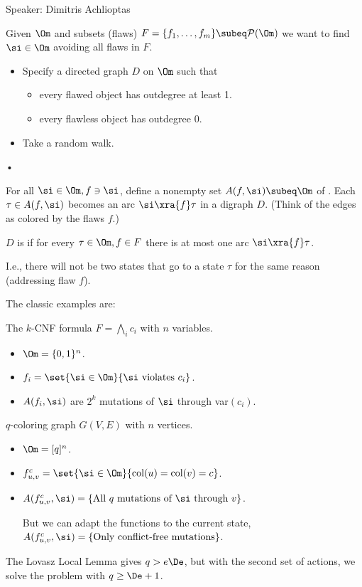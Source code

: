 Speaker: Dimitris Achlioptas

Given $\Om$ and subsets (flaws) $F=\{f_1,\ldots, f_m\}\subeq \cal P(\Om)$ we want to find $\si\in \Om$ avoiding all flaws in $F$.

\begin{itemize}
\item
Specify a directed graph $D$ on $\Om$ such that
\begin{itemize}
\item
every flawed object has outdegree at least 1.
\item
every flawless object has outdegree 0.
\end{itemize}
\item 
Take a random walk.
\end{itemize}•

For all $\si\in \Om,f\ni \si$, define a nonempty set $A(f,\si)\subeq \Om$ of . Each $\tau\in A(f,\si)$ becomes an arc $\si\xra{f} \tau $ in a digraph $D$. (Think of the edges as colored by the flaws $f$.)
\begin{df}
$D$ is  if for every $\tau\in \Om,f\in F$ there is at most one arc $\si\xra{f}\tau$.
\end{df}
I.e., there will not be two states that go to a state $\tau$ for the same reason (addressing flaw $f$).

The classic examples are:
\begin{ex}
The $k$-CNF formula $F=\bigwedge_i c_i$ with $n$ variables.
\begin{itemize}
\item
$\Om=\{0,1\}^n$.
\item $f_i=\set{\si\in \Om}{\si\text{ violates }c_i}$.
\item $A(f_i,\si)$ are $2^k$ mutations of $\si$ through var$(c_i)$.
\end{itemize}
\end{ex}

\begin{ex}
$q$-coloring graph $G(V,E)$ with $n$ vertices.
\begin{itemize}
\item $\Om=[q]^n$.
\item $f_{u,v}^c= \set{\si\in \Om}{\text{col}(u)=\text{col}(v)=c}$.
\item $A(f_{u,v}^c,\si)=\{\text{All $q$ mutations of $\si$ through $v$}\}$.

But we can adapt the functions to the current state, $A(f_{u,v}^c, \si)=\{\text{Only conflict-free mutations}\}$.
\end{itemize}
\end{ex}
The Lovasz Local Lemma gives $q>e\De$, but with the second set of actions, we solve the problem with $q\ge \De+1$.


